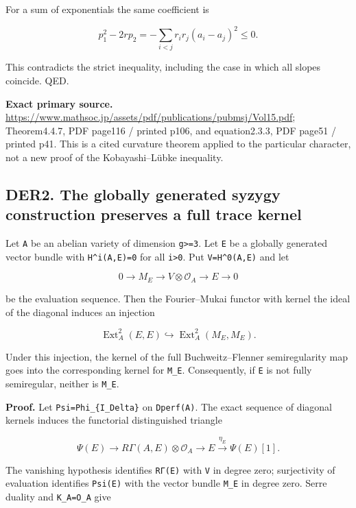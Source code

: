 \documentclass[11pt,a4paper]{article}
\theoremstyle{definition}
\begin{document}
For a sum of exponentials the same coefficient is

\[
 p_1^2-2rp_2
 =-\sum_{i<j}r_i r_j(a_i-a_j)^2\le0.
\]

This contradicts the strict inequality, including the case in which all
slopes coincide. QED.

\textbf{Exact primary source.}
\url{https://www.mathsoc.jp/assets/pdf/publications/pubmsj/Vol15.pdf};
Theorem4.4.7, PDF page116 / printed p106, and equation2.3.3, PDF page51
/ printed p41. This is a cited curvature theorem applied to the
particular character, not a new proof of the Kobayashi--Lübke
inequality.

\subsection{DER2. The globally generated syzygy construction preserves a
full trace
kernel}\label{der2.-the-globally-generated-syzygy-construction-preserves-a-full-trace-kernel}

Let \texttt{A} be an abelian variety of dimension
\texttt{g\textgreater{}=3}. Let \texttt{E} be a globally generated
vector bundle with \texttt{H\^{}i(A,E)=0} for all
\texttt{i\textgreater{}0}. Put \texttt{V=H\^{}0(A,E)} and let

\[
 0\longrightarrow M_E\longrightarrow V\otimes\mathcal O_A
 \longrightarrow E\longrightarrow0
\tag{DER2a}
\]

be the evaluation sequence. Then the Fourier--Mukai functor with kernel
the ideal of the diagonal induces an injection

\[
 \operatorname{Ext}^2_A(E,E)
 \hookrightarrow \operatorname{Ext}^2_A(M_E,M_E).
\tag{DER2b}
\]

Under this injection, the kernel of the full Buchweitz--Flenner
semiregularity map goes into the corresponding kernel for \texttt{M\_E}.
Consequently, if \texttt{E} is not fully semiregular, neither is
\texttt{M\_E}.

\textbf{Proof.} Let \texttt{Psi=Phi\_\{I\_Delta\}} on \texttt{Dperf(A)}.
The exact sequence of diagonal kernels induces the functorial
distinguished triangle

\[
 \Psi(E)\longrightarrow R\Gamma(A,E)\otimes\mathcal O_A
 \longrightarrow E\xrightarrow{\eta_E}\Psi(E)[1].
\]

The vanishing hypothesis identifies \texttt{RΓ(E)} with \texttt{V} in
degree zero; surjectivity of evaluation identifies \texttt{Psi(E)} with
the vector bundle \texttt{M\_E} in degree zero. Serre duality and
\texttt{K\_A=O\_A} give
\end{document}

